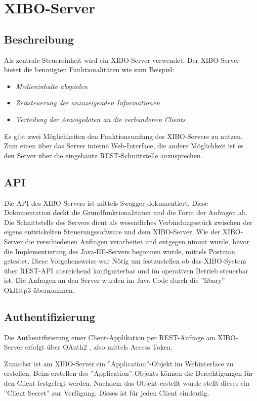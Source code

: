 \chapter{XIBO-Server}
\section{Beschreibung}
Als zentrale Steuereinheit wird ein XIBO-Server verwendet. Der XIBO-Server bietet die benötigten Funktionalitäten wie zum Beispiel:
\begin{itemize}
	\item {\em Medieninhalte abspielen} 
	\item {\em Zeitsteuerung der anzuzeigenden Informationen}  
	\item {\em Verteilung der Anzeigedaten an die verbundenen Clients} 
\end{itemize}
Es gibt zwei Möglichkeiten den Funktionsumfang des XIBO-Servers zu nutzen. Zum einen über das Server interne Web-Interface, die andere Möglichkeit ist es den Server über die eingebaute REST-Schnittstelle anzusprechen.
\cite{xibo-server}
\section{API}
Die API des XIBO-Servers ist mittels Swagger dokumentiert. Diese Dokumentation deckt die Grundfunktionalitäten und die Form der Anfragen ab. Die Schnittstelle des Servers dient als wesentliches Verbindungsstück zwischen der eigens entwickelten Steuerungssoftware und dem XIBO-Server. Wie der XIBO-Server die verschiedenen Anfragen verarbeitet und entgegen nimmt wurde, bevor die Implementierung des Java-EE-Servers begonnen wurde, mittels Postman getestet. Diese Vorgehensweise war Nötig um festzustellen ob das XIBO-System über REST-API ausreichend konfigurierbar und im operativen Betrieb steuerbar ist. Die Anfragen an den Server wurden im Java Code durch die ''libary'' OkHttp3 übernommen.

\cite{swagger}
\cite{postman}
\cite{Okhttp3}
\section{Authentifizierung}

Die Authentifizierung einer Client-Applikation per REST-Anfrage am XIBO-Server erfolgt über OAuth2 , also mittels Access Token.

Zunächst ist am XIBO-Server ein ''Application''-Objekt im Webinterface zu erstellen. Beim erstellen des ''Application''-Objekts können die Berechtigungen für den Client festgelegt werden. Nachdem das Objekt erstellt wurde stellt dieses ein ''Client Secret'' zur Verfügung. Dieses ist für jeden Client eindeutig. 

